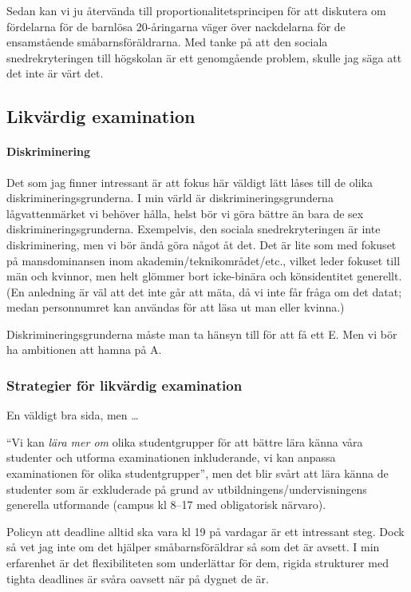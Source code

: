Sedan kan vi ju återvända till proportionalitetsprincipen för att
diskutera om fördelarna för de barnlösa 20-åringarna väger över
nackdelarna för de ensamstående småbarnsföräldrarna. Med tanke på att
den sociala snedrekryteringen till högskolan är ett genomgående problem,
skulle jag säga att det inte är värt det.

\subsection{Likvärdig examination}\label{likvärdig-examination}

\paragraph{Diskriminering}

Det som jag finner intressant är att fokus här väldigt
lätt låses till de olika diskrimineringsgrunderna. I min värld är
diskrimineringsgrunderna lågvattenmärket vi behöver hålla, helst bör vi
göra bättre än bara de sex diskrimineringsgrunderna. Exempelvis, den
sociala snedrekryteringen är inte diskriminering, men vi bör ändå göra
något åt det. Det är lite som med fokuset på mansdominansen inom
akademin/teknikområdet/etc., vilket leder fokuset till män och kvinnor,
men helt glömmer bort icke-binära och könsidentitet generellt. (En
anledning är väl att det inte går att mäta, då vi inte får fråga om det
datat; medan personnumret kan användas för att läsa ut man eller
kvinna.)

Diskrimineringsgrunderna måste man ta hänsyn till för att få ett E. Men
vi bör ha ambitionen att hamna på A.

\subsubsection{Strategier för likvärdig examination}%
\label{strategier-likvärdig-examination}

En väldigt bra sida, men \ldots{}

``Vi kan \emph{lära mer om} olika studentgrupper för att bättre lära
känna våra studenter och utforma examinationen inkluderande, vi kan
anpassa examinationen för olika studentgrupper'', men det blir svårt att
lära känna de studenter som är exkluderade på grund av
utbildningens/undervisningens generella utformande (campus kl 8--17 med
obligatorisk närvaro).

Policyn att deadline alltid ska vara kl 19 på vardagar är ett intressant
steg. Dock så vet jag inte om det hjälper småbarnsföräldrar så som det
är avsett. I min erfarenhet är det flexibiliteten som underlättar för
dem, rigida strukturer med tighta deadlines är svåra oavsett när på
dygnet de är.

